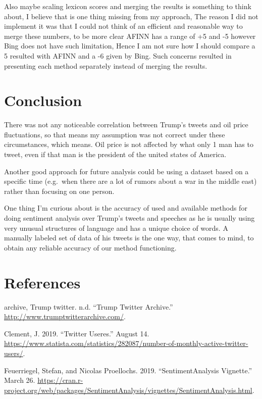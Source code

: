 \documentclass[]{article}
\begin{document}
Also maybe scaling lexicon scores and merging the results is something
to think about, I believe that is one thing missing from my approach,
The reason I did not implement it was that I could not think of an
efficient and reasonable way to merge these numbers, to be more clear
AFINN has a range of +5 and -5 however Bing does not have such
limitation, Hence I am not sure how I should compare a 5 resulted with
AFINN and a -6 given by Bing. Such concerns resulted in presenting each
method separately instead of merging the results.

\section{Conclusion}\label{conclusion}

There was not any noticeable correlation between Trump's tweets and oil
price fluctuations, so that means my assumption was not correct under
these circumstances, which means. Oil price is not affected by what only
1 man has to tweet, even if that man is the president of the united
states of America.

Another good approach for future analysis could be using a dataset based
on a specific time (e.g.~when there are a lot of rumors about a war in
the middle east) rather than focusing on one person.

One thing I'm curious about is the accuracy of used and available
methods for doing sentiment analysis over Trump's tweets and speeches as
he is usually using very unusual structures of language and has a unique
choice of words. A manually labeled set of data of his tweets is the one
way, that comes to mind, to obtain any reliable accuracy of our method
functioning.

\newpage

\section*{References}\label{references}

\hypertarget{refs}{}
\hypertarget{ref-trump_twitter_archive_trump_nodate}{}
archive, Trump twitter. n.d. ``Trump Twitter Archive.''
\url{http://www.trumptwitterarchive.com/}.

\hypertarget{ref-j_clement_twitter_2019}{}
Clement, J. 2019. ``Twitter Useres.'' August 14.
\url{https://www.statista.com/statistics/282087/number-of-monthly-active-twitter-users/}.

\hypertarget{ref-feuerriegel_sentimentanalysis_2019}{}
Feuerriegel, Stefan, and Nicolas Proellochs. 2019. ``SentimentAnalysis
Vignette.'' March 26.
\url{https://cran.r-project.org/web/packages/SentimentAnalysis/vignettes/SentimentAnalysis.html}.
\end{document}
